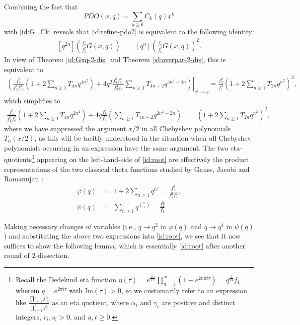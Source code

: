 \documentclass[11pt,reqno]{amsart}
\numberwithin{equation}{section}
\theoremstyle{plain}
\theoremstyle{definition}
\theoremstyle{named}
\begin{document}
Combining the fact that 
$$PDO(x,q)=\sum_{k\ge 0}C_k(q)x^{k}$$
with \eqref{id:G=Ck} reveals that \eqref{id:refine-pdo2} is equivalent to the following identity: 
\begin{align}\label{id:Gx}
[q^{2n}]\left(\frac{f_2}{f_1^2}G(x,q)\right) &= [q^n]\left(\frac{f_2}{f_1^2}G(x,q)\right)^2.
\end{align}
In view of Theorem \ref{id:Gxq-2-dis} and Theorem \ref{id:overpar-2-dis}, this is equivalent to
\begin{align*}
\left.\left(\frac{f_8^5}{f_2^4f_{16}^2}\left(1+2\sum_{n\ge 1}T_{4n}q^{4n^2}\right)+4q^2\frac{f_4^2f_{16}^2}{f_2^4f_8}\sum_{n\ge 1}T_{4n-2}q^{4n^2-4n}\right)\right\vert_{q^2\to q}=\frac{f_2^2}{f_1^4}\left(1+2\sum_{n\ge 1}T_{2n}q^{n^2}\right)^2,
\end{align*}
which simplifies to 
\begin{align}\label{id:root}
\frac{f_4^5}{f_2^2f_8^2}\left(1+2\sum_{n\ge 1}T_{4n}q^{2n^2}\right) + 4q\frac{f_8^2}{f_4}\left(\sum_{n\ge 1}T_{4n-2}q^{2n^2-2n}\right) &= \left(1+2\sum_{n\ge 1}T_{2n}q^{n^2}\right)^2,
\end{align}
where we have suppressed the argument $x/2$ in all Chebyshev polynomials $T_n(x/2)$, as this will be tacitly understood in the situation when all Chebyshev polynomials occurring in an expression have the same argument. The two eta-quotients\footnote{Recall the Dedekind eta function $\eta(\tau)=e^{\frac{\pi i\tau}{12}}\prod_{n=1}^{\infty}(1-e^{2n\pi i\tau})=q^{\frac{1}{24}}f_1$ wherein $q=e^{2\pi i\tau}$ with $\mathrm{Im}(\tau)>0$, so we customarily refer to an expression like $\frac{\prod_{i=1}^uf^{r_i}_{\alpha_i}}{\prod_{i=1}^tf_{\gamma_i}^{s_i}}$ as an eta quotient, where $\alpha_i$ and $\gamma_i$ are positive and distinct integers, $r_i,s_i>0$, and $u,t\ge 0$.} appearing on the left-hand-side of \eqref{id:root} are effectively the product representations of the two classical theta functions studied by Gauss, Jacobi and Ramanujan \cite[(1.5.6) and (1.5.7)]{Hir}:
\begin{align*}
\varphi(q) &:= 1+2\sum_{n\ge 1}q^{n^2}=\frac{f_2^5}{f_1^2f_4^2},\\
\psi(q) &:= \sum_{n\ge 1}q^{\binom{n}{2}}=\frac{f_2^2}{f_1}.
\end{align*}

Making necessary changes of variables (i.e., $q\to q^2$ in $\varphi(q)$ and $q\to q^4$ in $\psi(q)$) and substituting the above two expressions into \eqref{id:root}, we see that it now suffices to show the following lemma, which is essentially \eqref{id:root} after another round of $2$-dissection.
\end{document}
